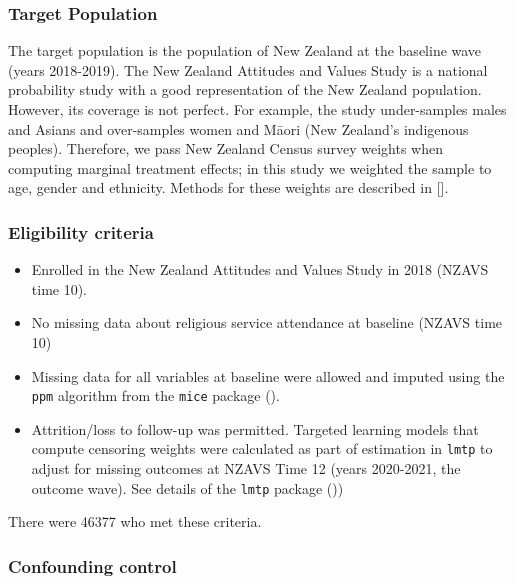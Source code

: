 \documentclass[
  single column]{article}
\providecommand{\tightlist}{%
  \setlength{\itemsep}{0pt}\setlength{\parskip}{0pt}}\usepackage{longtable,booktabs,array}
\begin{document}
\subsubsection{Target Population}\label{target-population}

The target population is the population of New Zealand at the baseline
wave (years 2018-2019). The New Zealand Attitudes and Values Study is a
national probability study with a good representation of the New Zealand
population. However, its coverage is not perfect. For example, the study
under-samples males and Asians and over-samples women and Māori (New
Zealand's indigenous peoples). Therefore, we pass New Zealand Census
survey weights when computing marginal treatment effects; in this study
we weighted the sample to age, gender and ethnicity. Methods for these
weights are described in {[}{]}.

\subsubsection{Eligibility criteria}\label{eligibility-criteria}

\begin{itemize}
\tightlist
\item
  Enrolled in the New Zealand Attitudes and Values Study in 2018 (NZAVS
  time 10).
\item
  No missing data about religious service attendance at baseline (NZAVS
  time 10)
\item
  Missing data for all variables at baseline were allowed and imputed
  using the \texttt{ppm} algorithm from the \texttt{mice} package
  ().
\item
  Attrition/loss to follow-up was permitted. Targeted learning models
  that compute censoring weights were calculated as part of estimation
  in \texttt{lmtp} to adjust for missing outcomes at NZAVS Time 12
  (years 2020-2021, the outcome wave). See details of the \texttt{lmtp}
  package ())
\end{itemize}

There were 46377 who met these criteria.

\subsubsection{Confounding control}\label{confounding-control}
\end{document}
